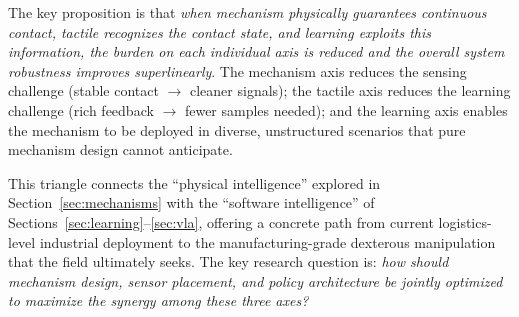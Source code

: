 The key proposition is that \emph{when mechanism physically guarantees continuous contact, tactile recognizes the contact state, and learning exploits this information, the burden on each individual axis is reduced and the overall system robustness improves superlinearly}. The mechanism axis reduces the sensing challenge (stable contact $\to$ cleaner signals); the tactile axis reduces the learning challenge (rich feedback $\to$ fewer samples needed); and the learning axis enables the mechanism to be deployed in diverse, unstructured scenarios that pure mechanism design cannot anticipate.

This triangle connects the ``physical intelligence'' explored in Section~\ref{sec:mechanisms} with the ``software intelligence'' of Sections~\ref{sec:learning}--\ref{sec:vla}, offering a concrete path from current logistics-level industrial deployment to the manufacturing-grade dexterous manipulation that the field ultimately seeks. The key research question is: \emph{how should mechanism design, sensor placement, and policy architecture be jointly optimized to maximize the synergy among these three axes?}
